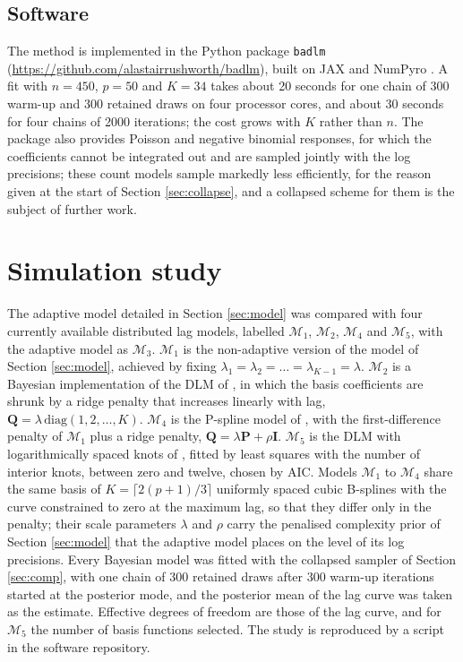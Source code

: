 \documentclass[11pt]{article}
\newcommand{\bP}{\mathbf{P}}
\newcommand{\bQ}{\mathbf{Q}}
\newcommand{\M}[1]{\mathcal{M}_{#1}}
\begin{document}
\subsection{Software}
\label{sec:software}

The method is implemented in the Python package \texttt{badlm}
(\url{https://github.com/alastairrushworth/badlm}), built on JAX
\citep{jax2018} and NumPyro \citep{phan2019}. A fit with $n = 450$, $p = 50$
and $K = 34$ takes about 20 seconds for one chain of 300 warm-up and 300
retained draws on four processor cores, and about 30 seconds for four chains
of 2000 iterations; the cost grows with $K$ rather than $n$. The package also
provides Poisson and negative binomial responses, for which the coefficients
cannot be integrated out and are sampled jointly with the log precisions;
these count models sample markedly less efficiently, for the reason given at
the start of Section \ref{sec:collapse}, and a collapsed scheme for them is
the subject of further work.

\section{Simulation study}
\label{sec:sim}

The adaptive model detailed in Section \ref{sec:model} was compared with four
currently available distributed lag models, labelled $\M{1}$, $\M{2}$,
$\M{4}$ and $\M{5}$, with the adaptive model as $\M{3}$. $\M{1}$ is the
non-adaptive version of the model of Section \ref{sec:model}, achieved by
fixing $\lambda_1 = \lambda_2 = \ldots = \lambda_{K-1} = \lambda$. $\M{2}$ is
a Bayesian implementation of the DLM of \citet{muggeo2008}, in which the
basis coefficients are shrunk by a ridge penalty that increases linearly with
lag, $\bQ = \lambda\, \mbox{diag}(1, 2, \ldots, K)$. $\M{4}$ is the P-spline
model of \citet{obermeier2015}, with the first-difference penalty of $\M{1}$
plus a ridge penalty, $\bQ = \lambda \bP + \rho \mathbf{I}$. $\M{5}$ is the
DLM with logarithmically spaced knots of \citet{gasparrini2010}, fitted by
least squares with the number of interior knots, between zero and twelve,
chosen by AIC. Models $\M{1}$ to $\M{4}$ share the same basis of $K =
\lceil 2(p + 1)/3 \rceil$ uniformly spaced cubic B-splines with the curve
constrained to zero at the maximum lag, so that they differ only in the
penalty; their scale parameters $\lambda$ and $\rho$ carry the penalised
complexity prior of Section \ref{sec:model} that the adaptive model places on
the level of its log precisions. Every Bayesian model was fitted with the
collapsed sampler of Section \ref{sec:comp}, with one chain of 300 retained
draws after 300 warm-up iterations started at the posterior mode, and the
posterior mean of the lag curve was taken as the estimate. Effective degrees
of freedom are those of the lag curve, and for $\M{5}$ the number of basis
functions selected. The study is reproduced by a script in the software
repository.
\end{document}
